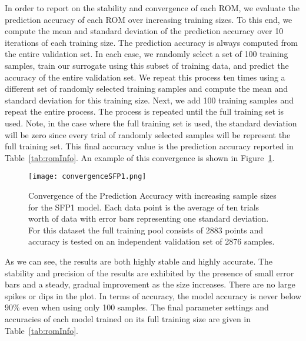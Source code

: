 In order to report on the stability and convergence of each ROM, we evaluate the prediction accuracy of each ROM over increasing training sizes.
%
To this end, we compute the mean and standard deviation of the prediction accuracy over 10 iterations of each training size.
%
The prediction accuracy is always computed from the entire validation set.
%
In each case, we randomly select a set of 100 training samples, train our surrogate using this subset of training data, and predict the accuracy of the entire validation set.
%
We repeat this process ten times using a different set of randomly selected training samples and compute the mean and standard deviation for this training size.
%
Next, we add 100 training samples and repeat the entire process.
%
The process is repeated until the full training set is used.
%
Note, in the case where the full training set is used, the standard deviation will be zero since every trial of randomly selected samples will be represent the full training set.
%
This final accuracy value is the prediction accuracy reported in Table~\ref{tab:romInfo}.
%
An example of this convergence is shown in Figure~\ref{fig:romConvergence}.

\begin{figure}[!htbp]
	\centering
	\texttt{[image: convergenceSFP1.png]}
	\caption{Convergence of the Prediction Accuracy with increasing sample sizes for the SFP1 model. Each data point is the average of ten trials
	worth of data with error bars representing one standard deviation. For this dataset the full training pool consists of 2883 points and accuracy is tested on an independent validation set of 2876 samples.}
	\label{fig:romConvergence}
\end{figure}

As we can see, the results are both highly stable and highly accurate.
%
The stability and precision of the results are exhibited by the presence of small error bars and a steady, gradual improvement as the size increases.
%
There are no large spikes or dips in the plot.
%
In terms of accuracy, the model accuracy is never below $90\%$ even when using only 100 samples.
%
The final parameter settings and accuracies of each model trained on its full training size are given in Table~\ref{tab:romInfo}.

